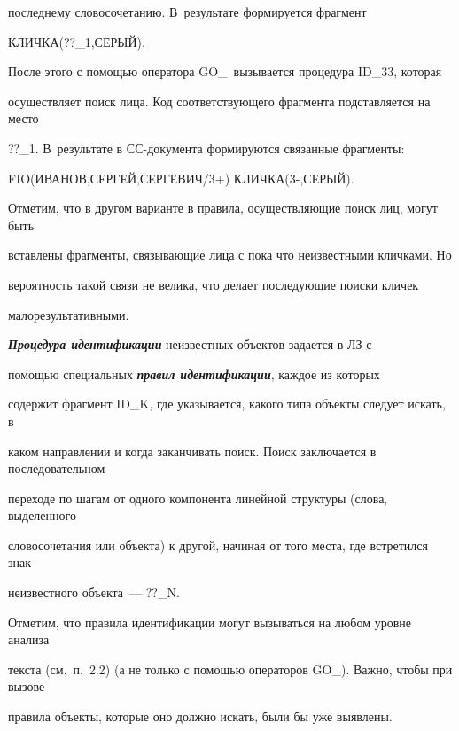 последнему словосочетанию. В~результате формируется фрагмент  


{\sf КЛИЧКА(??\_1,СЕРЫЙ)}. 





После этого с помощью оператора {\sf GO\_}\ вызывается процедура ID\_33, которая 


осуществляет поиск лица. Код соответствующего фрагмента подставляется на место 


{\sf ??\_1}. В~результате в СС-документа формируются связанные фрагменты: 


    


{\sf          FIO(ИВАНОВ,СЕРГЕЙ,СЕРГЕВИЧ/3+) КЛИЧКА(3-,СЕРЫЙ)}.





    Отметим, что в другом варианте в правила, осуществляющие поиск лиц, могут быть 


вставлены фрагменты, связывающие лица с пока что неизвестными кличками. Но 


вероятность такой связи не велика, что делает последующие поиски кличек 


малорезультативными. 





{\bfseries\textit{Процедура идентификации}} неизвестных объектов задается в ЛЗ с 


помощью специальных {\bfseries\textit{правил идентификации}}, каждое из которых 


содержит фрагмент ID\_K, где указывается, какого типа объекты следует искать, в 


каком направлении и когда заканчивать поиск. Поиск заключается в последовательном 


переходе по шагам от одного компонента линейной структуры (слова, выделенного 


словосочетания или объекта) к другой, начиная от того места, где встретился знак 


неизвестного объекта~---  {\sf ??\_N}.





 Отметим, что правила идентификации могут вызываться на любом уровне анализа 


текста (см.\ п.~2.2) (а не только с помощью операторов {\sf GO\_}). Важно, чтобы при вызове 


правила объекты, которые оно должно искать, были бы уже выявлены.    





